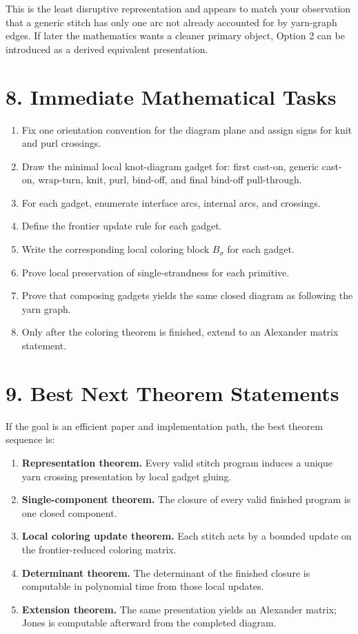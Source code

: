 \documentclass[11pt]{article}
\begin{document}
This is the least disruptive representation and appears to match your observation that a generic stitch has only one arc not already accounted for by yarn-graph edges. If later the mathematics wants a cleaner primary object, Option 2 can be introduced as a derived equivalent presentation.

\section*{8. Immediate Mathematical Tasks}
\begin{enumerate}[leftmargin=1.5em,itemsep=0.25em]
    \item Fix one orientation convention for the diagram plane and assign signs for knit and purl crossings.
    \item Draw the minimal local knot-diagram gadget for:
    first cast-on, generic cast-on, wrap-turn, knit, purl, bind-off, and final bind-off pull-through.
    \item For each gadget, enumerate interface arcs, internal arcs, and crossings.
    \item Define the frontier update rule for each gadget.
    \item Write the corresponding local coloring block \(B_\sigma\) for each gadget.
    \item Prove local preservation of single-strandness for each primitive.
    \item Prove that composing gadgets yields the same closed diagram as following the yarn graph.
    \item Only after the coloring theorem is finished, extend to an Alexander matrix statement.
\end{enumerate}

\section*{9. Best Next Theorem Statements}
If the goal is an efficient paper and implementation path, the best theorem sequence is:

\begin{enumerate}[leftmargin=1.5em,itemsep=0.25em]
    \item \textbf{Representation theorem.} Every valid stitch program induces a unique yarn crossing presentation by local gadget gluing.
    \item \textbf{Single-component theorem.} The closure of every valid finished program is one closed component.
    \item \textbf{Local coloring update theorem.} Each stitch acts by a bounded update on the frontier-reduced coloring matrix.
    \item \textbf{Determinant theorem.} The determinant of the finished closure is computable in polynomial time from those local updates.
    \item \textbf{Extension theorem.} The same presentation yields an Alexander matrix; Jones is computable afterward from the completed diagram.
\end{enumerate}
\end{document}
